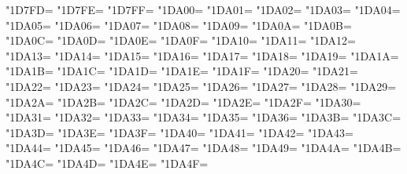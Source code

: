 \XeTeXcharclass"1D7FD=\KclassNum
\XeTeXcharclass"1D7FE=\KclassNum
\XeTeXcharclass"1D7FF=\KclassNum
\XeTeXcharclass"1DA00=\KclassNum
\XeTeXcharclass"1DA01=\KclassNum
\XeTeXcharclass"1DA02=\KclassNum
\XeTeXcharclass"1DA03=\KclassNum
\XeTeXcharclass"1DA04=\KclassNum
\XeTeXcharclass"1DA05=\KclassNum
\XeTeXcharclass"1DA06=\KclassNum
\XeTeXcharclass"1DA07=\KclassNum
\XeTeXcharclass"1DA08=\KclassNum
\XeTeXcharclass"1DA09=\KclassNum
\XeTeXcharclass"1DA0A=\KclassNum
\XeTeXcharclass"1DA0B=\KclassNum
\XeTeXcharclass"1DA0C=\KclassNum
\XeTeXcharclass"1DA0D=\KclassNum
\XeTeXcharclass"1DA0E=\KclassNum
\XeTeXcharclass"1DA0F=\KclassNum
\XeTeXcharclass"1DA10=\KclassNum
\XeTeXcharclass"1DA11=\KclassNum
\XeTeXcharclass"1DA12=\KclassNum
\XeTeXcharclass"1DA13=\KclassNum
\XeTeXcharclass"1DA14=\KclassNum
\XeTeXcharclass"1DA15=\KclassNum
\XeTeXcharclass"1DA16=\KclassNum
\XeTeXcharclass"1DA17=\KclassNum
\XeTeXcharclass"1DA18=\KclassNum
\XeTeXcharclass"1DA19=\KclassNum
\XeTeXcharclass"1DA1A=\KclassNum
\XeTeXcharclass"1DA1B=\KclassNum
\XeTeXcharclass"1DA1C=\KclassNum
\XeTeXcharclass"1DA1D=\KclassNum
\XeTeXcharclass"1DA1E=\KclassNum
\XeTeXcharclass"1DA1F=\KclassNum
\XeTeXcharclass"1DA20=\KclassNum
\XeTeXcharclass"1DA21=\KclassNum
\XeTeXcharclass"1DA22=\KclassNum
\XeTeXcharclass"1DA23=\KclassNum
\XeTeXcharclass"1DA24=\KclassNum
\XeTeXcharclass"1DA25=\KclassNum
\XeTeXcharclass"1DA26=\KclassNum
\XeTeXcharclass"1DA27=\KclassNum
\XeTeXcharclass"1DA28=\KclassNum
\XeTeXcharclass"1DA29=\KclassNum
\XeTeXcharclass"1DA2A=\KclassNum
\XeTeXcharclass"1DA2B=\KclassNum
\XeTeXcharclass"1DA2C=\KclassNum
\XeTeXcharclass"1DA2D=\KclassNum
\XeTeXcharclass"1DA2E=\KclassNum
\XeTeXcharclass"1DA2F=\KclassNum
\XeTeXcharclass"1DA30=\KclassNum
\XeTeXcharclass"1DA31=\KclassNum
\XeTeXcharclass"1DA32=\KclassNum
\XeTeXcharclass"1DA33=\KclassNum
\XeTeXcharclass"1DA34=\KclassNum
\XeTeXcharclass"1DA35=\KclassNum
\XeTeXcharclass"1DA36=\KclassNum
\XeTeXcharclass"1DA3B=\KclassNum
\XeTeXcharclass"1DA3C=\KclassNum
\XeTeXcharclass"1DA3D=\KclassNum
\XeTeXcharclass"1DA3E=\KclassNum
\XeTeXcharclass"1DA3F=\KclassNum
\XeTeXcharclass"1DA40=\KclassNum
\XeTeXcharclass"1DA41=\KclassNum
\XeTeXcharclass"1DA42=\KclassNum
\XeTeXcharclass"1DA43=\KclassNum
\XeTeXcharclass"1DA44=\KclassNum
\XeTeXcharclass"1DA45=\KclassNum
\XeTeXcharclass"1DA46=\KclassNum
\XeTeXcharclass"1DA47=\KclassNum
\XeTeXcharclass"1DA48=\KclassNum
\XeTeXcharclass"1DA49=\KclassNum
\XeTeXcharclass"1DA4A=\KclassNum
\XeTeXcharclass"1DA4B=\KclassNum
\XeTeXcharclass"1DA4C=\KclassNum
\XeTeXcharclass"1DA4D=\KclassNum
\XeTeXcharclass"1DA4E=\KclassNum
\XeTeXcharclass"1DA4F=\KclassNum
